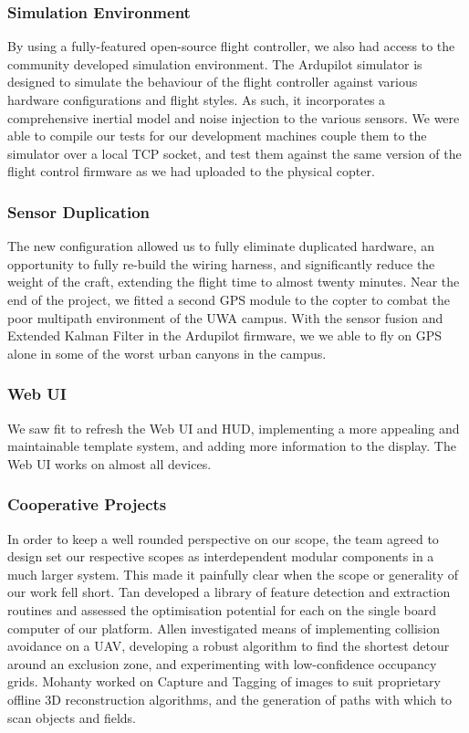 \documentclass{article}
\begin{document}
    \subsubsection{Simulation Environment}
      By using a fully-featured open-source flight controller, we also had access to the community developed simulation environment.  
      The Ardupilot simulator is designed to simulate the behaviour of the flight controller against various hardware configurations and flight styles.  As such, it incorporates a comprehensive inertial model and noise injection to the various sensors.
      We were able to compile our tests for our development machines couple them to the simulator over a local TCP socket, and test them against the same version of the flight control firmware as we had uploaded to the physical copter.

    \subsubsection{Sensor Duplication}
      The new configuration allowed us to fully eliminate duplicated hardware, an opportunity to fully re-build the wiring harness, and significantly reduce the weight of the craft, extending the flight time to almost twenty minutes.
      Near the end of the project, we fitted a second GPS module to the copter to combat the poor multipath environment of the UWA campus.  With the sensor fusion and Extended Kalman Filter in the Ardupilot firmware, we we able to fly on GPS alone in some of the worst urban canyons in the campus.


    \subsubsection{Web UI}
      We saw fit to refresh the Web UI and HUD, implementing a more appealing and maintainable template system, and adding more information to the display.
      The Web UI works on almost all devices.

    \subsubsection{Cooperative Projects}
      In order to keep a well rounded perspective on our scope, the team agreed to design set our respective scopes as interdependent modular components in a much larger system.  This made it painfully clear when the scope or generality of our work fell short.
      Tan \cite{Tan} developed a library of feature detection and extraction routines and assessed the optimisation potential for each on the single board computer of our platform.
      Allen \cite{Allen} investigated means of implementing collision avoidance on a UAV, developing a robust algorithm to find the shortest detour around an exclusion zone, and experimenting with low-confidence occupancy grids.
      Mohanty \cite{Mohanty} worked on Capture and Tagging of images to suit proprietary offline 3D reconstruction algorithms, and the generation of paths with which to scan objects and fields.
\end{document}
